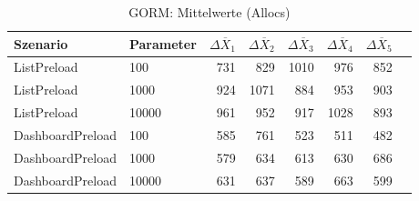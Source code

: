 
\begin{table}[ht]
\setlength{\extrarowheight}{-1pt}
\centering
\caption{GORM: Mittelwerte (Allocs)}
\begin{tabular}{llrrrrrr}
\toprule
Szenario & Parameter & ${\Delta \overline{X}_1}$ & ${\Delta \overline{X}_2}$ & ${\Delta \overline{X}_3}$ & ${\Delta \overline{X}_4}$ & ${\Delta \overline{X}_5}$ \\
\midrule
	ListPreload & 100 & 731 & 829 & 1010 & 976 & 852 \\
	ListPreload & 1000 & 924 & 1071 & 884 & 953 & 903 \\
	ListPreload & 10000 & 961 & 952 & 917 & 1028 & 893 \\
	DashboardPreload & 100 & 585 & 761 & 523 & 511 & 482 \\
	DashboardPreload & 1000 & 579 & 634 & 613 & 630 & 686 \\
	DashboardPreload & 10000 & 631 & 637 & 589 & 663 & 599 \\
\bottomrule
\end{tabular}
\label{tab:mittelwerte_gorm_allocs}
\end{table}
	